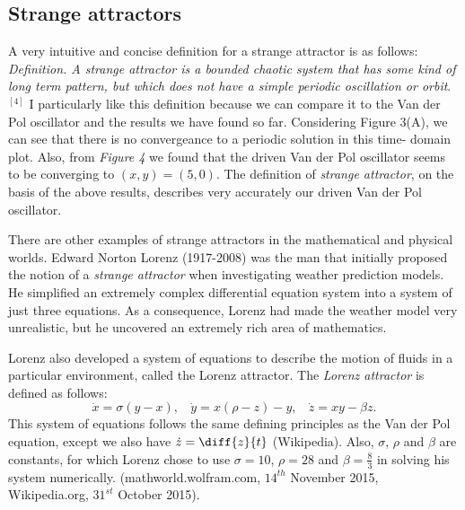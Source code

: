 \documentclass[11pt,a4paper]{amsart}
\begin{document}
\subsection*{Strange attractors} A very intuitive and concise definition for a strange attractor is as follows:\\
\textit{Definition. A strange attractor is a bounded chaotic system that has some kind of long term pattern, but which does not have a simple periodic oscillation or orbit}.$^{[4]}$ I particularly like this definition because we can compare it to the Van der Pol oscillator and the results we have found so far. Considering Figure 3(A), we can see that there is no convergeance to a periodic solution in this time- domain plot. Also, from \textit{Figure 4} we found that the driven Van der Pol oscillator seems to be converging to $(x,y)=(5,0)$. The definition of \textit{strange attractor}, on the basis of the above results, describes very accurately our driven Van der Pol oscillator.

There are other examples of strange attractors in the mathematical and physical worlds. Edward Norton Lorenz (1917-2008) was the man that initially proposed the notion of a \textit{strange attractor} when investigating weather prediction models. He simplified an extremely complex differential equation system into a system of just three equations. As a consequence, Lorenz had made the weather model very unrealistic, but he uncovered an extremely rich area of mathematics. 

Lorenz also developed a system of equations to describe the motion of fluids in a particular environment, called the Lorenz attractor. The \textit{Lorenz attractor} is defined as follows:
$$\dot{x}=\sigma (y-x),\ \ \ \ \dot{y}=x(\rho -z)-y,\ \ \ \ \dot{z}=xy-\beta z.$$ 
This system of equations follows the same defining principles as the Van der Pol equation, except we also have $\dot{z}=\diff{z}{t}$ (Wikipedia). Also, $\sigma$, $\rho$ and $\beta$ are constants, for which Lorenz chose to use $\sigma=10 $, $\rho=28$ and $\beta=\frac{8}{3}$ in solving his system numerically. (mathworld.wolfram.com, $14^{th}$ November 2015, Wikipedia.org, $31^{st}$ October 2015).
\end{document}
